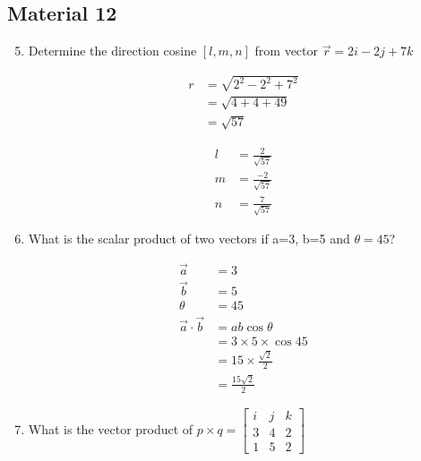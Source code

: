 \documentclass[12pt,titlepage]{article}
\begin{document}
\subsection*{Material 12}
\begin{enumerate}
    \setcounter{enumi}{4}
    \item {
        Determine the direction cosine $[l,m,n]$ from vector $\vec{r} = 2i - 2j + 7k$

        \begin{align*}
            r &= \sqrt{2^2 - 2^2 + 7^2} \\ 
            &= \sqrt{4 + 4 + 49} \\ 
            &= \sqrt{57}
        \end{align*}

        \begin{align*}
            l &= \frac{2}{\sqrt{57}} \\
            m &= \frac{-2}{\sqrt{57}} \\
            n &= \frac{7}{\sqrt{57}}
        \end{align*}
    }
    \item {
        What is the scalar product of two vectors if a=3, b=5 and $ \theta = 45$?

        \begin{align*}
            \vec{a} &= 3 \\
            \vec{b} &= 5 \\
            \theta &= 45 \\
            \vec{a} \cdot \vec{b} &= ab\cos\theta \\
            &= 3 \times 5 \times \cos 45 \\
            &= 15 \times \frac{\sqrt{2}}{2} \\
            &= \frac{15\sqrt{2}}{2}
        \end{align*}
    }
    \item {
        What is the vector product of $p \times q = \left[ \begin{matrix}
            i & j & k \\
            3 & 4 & 2 \\
            1 & 5 & 2
        \end{matrix} \right] $

}
\end{enumerate}
\end{document}
